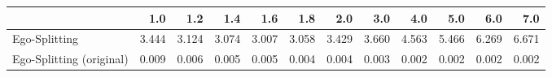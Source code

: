 \begin{tabular}{lrrrrrrrrrrr}
\toprule
{} &   1.0 &   1.2 &   1.4 &   1.6 &   1.8 &   2.0 &   3.0 &   4.0 &   5.0 &   6.0 &   7.0 \\
\midrule
Ego-Splitting            & 3.444 & 3.124 & 3.074 & 3.007 & 3.058 & 3.429 & 3.660 & 4.563 & 5.466 & 6.269 & 6.671 \\
Ego-Splitting (original) & 0.009 & 0.006 & 0.005 & 0.005 & 0.004 & 0.004 & 0.003 & 0.002 & 0.002 & 0.002 & 0.002 \\
\bottomrule
\end{tabular}
